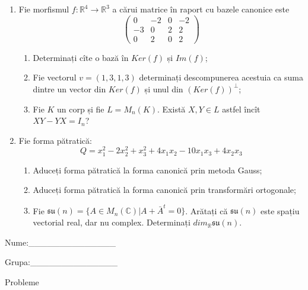 \documentclass{article}
\begin{document}
\begin{enumerate}
 \item Fie morfismul $f:\mathbb{R}^4 \to \mathbb{R}^3$ a cărui matrice în raport cu bazele canonice este
$$\begin{pmatrix}
0&-2&0&-2\\
-3&0&2&2\\
0&2&0&2
\end{pmatrix}$$

\begin{enumerate}
\item Determinați cîte o bază în $Ker(f)$ și $Im(f)$;
\item Fie vectorul $v=(1,3,1,3)$ determinați descompunerea acestuia ca suma dintre un vector din $Ker(f)$ și unul din $(Ker(f))^\perp$;
\item Fie $K$ un corp și fie $L=M_n(K)$. Există $X,Y \in L$ astfel încît $XY-YX=I_n$?  
\end{enumerate}
\item Fie forma pătratică:
$$Q= x_1^2-2x_2^2+x_3^2+4x_1x_2-10x_1x_3+4x_2x_3$$

\begin{enumerate}
\item Aduceți forma pătratică la forma canonică prin metoda Gauss;
\item Aduceți forma pătratică la forma canonică prin transformări ortogonale;
\item Fie $\mathfrak{su}(n)=\{ A \in M_n(\mathbb{C}) | A+\bar{A}^t=0\}$. Arătați că $\mathfrak{su}(n)$ este spațiu vectorial real, dar nu complex.
Determinați $dim_{\mathbb{R}}\mathfrak{su}(n)$.
\end{enumerate}
\end{enumerate}
\newpage
\begin{flushright}
Nume:\_\_\_\_\_\_\_\_\_\_\_\_\_\_
 
 
Grupa:\_\_\_\_\_\_\_\_\_\_\_\_\_\_
\end{flushright}
\begin{center}
\vspace{2cm}
{\Large Probleme}
\vspace{2cm}
\end{center}
\end{document}
